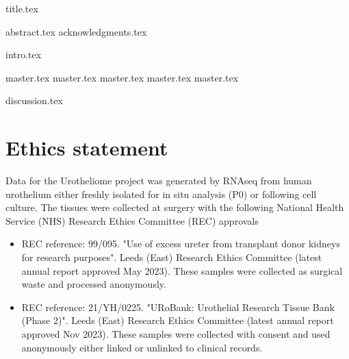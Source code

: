 \documentclass[a4paper, 12pt]{report}
\begin{document}
{title.tex}



\setcounter{tocdepth}{4}





{abstract.tex}
{acknowledgments.tex}

\tableofcontents
\newpage

\listoffigures
\newpage

\listoftables
\newpage
\printglossary[type=acronym,style=long,nonumberlist]
\newpage





{intro.tex}

{master.tex}
{master.tex}
{master.tex}
{master.tex}
{master.tex}

{discussion.tex}


\chapter{Ethics statement}

Data for the Urotheliome project was generated by RNAseq from human urothelium either freshly isolated for in situ analysis (P0) or following cell culture. The tissues were collected at surgery with the following National Health Service (NHS) Research Ethics Committee (REC) approvals

\begin{itemize}
    \item REC reference: 99/095. "Use of excess ureter from transplant donor kidneys for research purposes". Leeds (East) Research Ethics Committee (latest annual report approved May 2023). These samples were collected as surgical waste and processed anonymously.
    \item REC reference: 21/YH/0225. "URoBank: Urothelial Research Tissue Bank (Phase 2)". Leeds (East) Research Ethics Committee (latest annual report approved Nov 2023). These samples were collected with consent and used anonymously either linked or unlinked to clinical records.  
\end{itemize}
\end{document}
